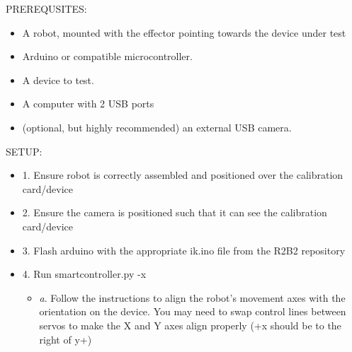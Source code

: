 \documentclass[a4paper,12pt]{letter}
\begin{document}
PREREQUSITES:
\begin{itemize}
\item A robot, mounted with the effector pointing towards the device under test
\item Arduino or compatible microcontroller.
\item A device to test.
\item A computer with 2 USB ports
\item (optional, but highly recommended) an external USB camera.
\end{itemize}

SETUP:
\begin{itemize}
\item 1. Ensure robot is correctly assembled and positioned over the calibration card/device
\item 2. Ensure the camera is positioned such that it can see the calibration card/device
\item 3. Flash arduino with the appropriate ik.ino file from the R2B2 repository
\item 4. Run smartcontroller.py -x
\begin{itemize}
\item \emph{a}. Follow the instructions to align the robot's movement axes with the orientation on the device. You may need to swap control lines between servos to make the X and Y axes align properly (+x should be to the right of y+)
\end{itemize}
\end{itemize}
\end{document}
